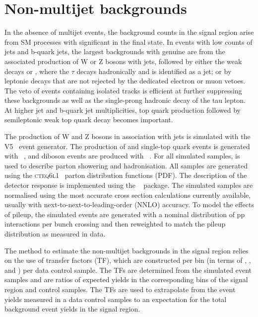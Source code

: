 \section{Non-multijet backgrounds}
\label{sec:ewk_background}

In the absence of multijet events, the background counts in the signal
region arise from SM processes with significant \met in the final
state. In events with low counts of jets and b-quark jets, the largest
backgrounds with genuine \met are from the associated production of W
or Z bosons with jets, followed by either the weak decays \znunu or
\wtaunu, where the $\tau$ decays hadronically and is identified as a
jet; or by leptonic decays that are not rejected by the dedicated
electron or muon vetoes. The veto of events containing isolated tracks
is efficient at further suppressing these backgrounds as well as the
single-prong hadronic decay of the tau lepton. At higher jet and
b-quark jet multiplicities, top quark production followed by
semileptonic weak top quark decay becomes important. 

The production of W and Z bosons in association with jets is simulated
with the \MADGRAPH V5~\cite{madgraph} event generator. The production
of \ttbar and single-top quark events is generated with
\POWHEG~\cite{powheg}, and diboson events are produced with
~\cite{pythia}. For all simulated samples,  is
used to describe parton showering and hadronisation. All samples are
generated using the \textsc{cteq6l1}~\cite{Pumplin:2002vw} parton
distribution functions (PDF). The description of the detector response
is implemented using the \GEANTfour~\cite{geant} package. The
simulated samples are normalised using the most accurate cross section
calculations currently available, usually with
next-to-next-to-leading-order (NNLO) accuracy. To model the effects of
pileup, the simulated events are generated with a nominal distribution
of pp interactions per bunch crossing and then reweighted to match the
pileup distribution as measured in data.

The method to estimate the non-multijet backgrounds in the signal
region relies on the use of transfer factors (TF), which are
constructed per bin (in terms of \njet, \nb, and \scalht) per data
control sample. The TFs are determined from the simulated event
samples and are ratios of expected yields in the corresponding bins of
the signal region and control samples. The TFs are used to extrapolate
from the event yields measured in a data control samples to an
expectation for the total background event yields in the signal
region. 


